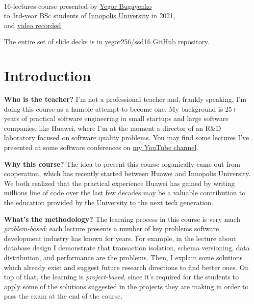 \documentclass[nobrand,anonymous,nodate,nosecurity]{huawei}
\begin{document}
{\\
16-lectures course presented by \href{https://www.yegor256.com}{Yegor Bugayenko}\\
to 3rd-year BSc students of \href{https://innopolis.university/en/}{Innopolis University} in 2021,\\
and \href{https://www.youtube.com/playlist?list=PLaIsQH4uc08woJKRAA7mmjs9fU0jeKjjM}{video recorded}}

The entire set of slide decks is in \href{https://github.com/yegor256/ssd16}{yegor256/ssd16} GitHub repository.

\section*{Introduction}

\textbf{Who is the teacher?}
I'm not a professional teacher and, frankly speaking, I'm doing this course
as a humble attempt to become one. My background is 25+ years of
practical software engineering in small startups and large software companies,
like Huawei, where I'm at the moment a director of an R\&D laboratory focused
on software quality problems. You may find some lectures I've presented
at some software conferences on \href{https://www.youtube.com/channel/UCr9qCdqXLm2SU0BIs6d_68Q}{my YouTube channel}.

\textbf{Why this course?}
The idea to present this course organically
came out from cooperation, which has recently started between
Huawei and Innopolis University. We both realized that the practical experience
Huawei has gained by writing millions line of code over the last few decades
may be a valuable contribution to the education provided by the University
to the next tech generation.

\textbf{What's the methodology?}
The learning process in this course is very much \emph{problem-based}:
each lecture presents a number of key problems software development industry
has known for years. For example, in the lecture about database design I
demonstrate that transaction isolation, schema versioning, data distribution, and
performance are the problems. Then, I explain some solutions which already
exist and suggest future research directions to find better ones. On top
of that, the learning is \emph{project-based}, since it's required for the
students to apply some of the solutions suggested in the projects they are
making in order to pass the exam at the end of the course.
\end{document}
